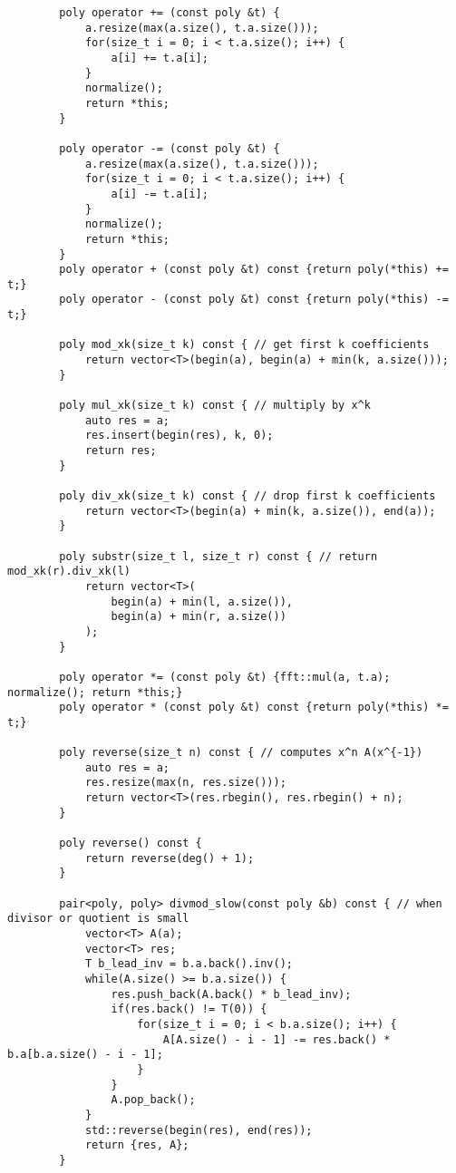 \begin{lstlisting}
        poly operator += (const poly &t) {
            a.resize(max(a.size(), t.a.size()));
            for(size_t i = 0; i < t.a.size(); i++) {
                a[i] += t.a[i];
            }
            normalize();
            return *this;
        }
        
        poly operator -= (const poly &t) {
            a.resize(max(a.size(), t.a.size()));
            for(size_t i = 0; i < t.a.size(); i++) {
                a[i] -= t.a[i];
            }
            normalize();
            return *this;
        }
        poly operator + (const poly &t) const {return poly(*this) += t;}
        poly operator - (const poly &t) const {return poly(*this) -= t;}
        
        poly mod_xk(size_t k) const { // get first k coefficients
            return vector<T>(begin(a), begin(a) + min(k, a.size()));
        }
        
        poly mul_xk(size_t k) const { // multiply by x^k
            auto res = a;
            res.insert(begin(res), k, 0);
            return res;
        }
        
        poly div_xk(size_t k) const { // drop first k coefficients
            return vector<T>(begin(a) + min(k, a.size()), end(a));
        }
        
        poly substr(size_t l, size_t r) const { // return mod_xk(r).div_xk(l)
            return vector<T>(
                begin(a) + min(l, a.size()),
                begin(a) + min(r, a.size())
            );
        }
        
        poly operator *= (const poly &t) {fft::mul(a, t.a); normalize(); return *this;}
        poly operator * (const poly &t) const {return poly(*this) *= t;}
        
        poly reverse(size_t n) const { // computes x^n A(x^{-1})
            auto res = a;
            res.resize(max(n, res.size()));
            return vector<T>(res.rbegin(), res.rbegin() + n);
        }
        
        poly reverse() const {
            return reverse(deg() + 1);
        }
        
        pair<poly, poly> divmod_slow(const poly &b) const { // when divisor or quotient is small
            vector<T> A(a);
            vector<T> res;
            T b_lead_inv = b.a.back().inv();
            while(A.size() >= b.a.size()) {
                res.push_back(A.back() * b_lead_inv);
                if(res.back() != T(0)) {
                    for(size_t i = 0; i < b.a.size(); i++) {
                        A[A.size() - i - 1] -= res.back() * b.a[b.a.size() - i - 1];
                    }
                }
                A.pop_back();
            }
            std::reverse(begin(res), end(res));
            return {res, A};
        }
        

\end{lstlisting}
